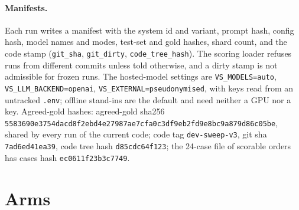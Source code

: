 \paragraph{Manifests.} Each run writes a manifest with the system id and variant, prompt hash, config hash, model names and modes, test-set and gold hashes, shard count, and the code stamp (\texttt{git\_sha}, \texttt{git\_dirty}, \texttt{code\_tree\_hash}). The scoring loader refuses runs from different commits unless told otherwise, and a dirty stamp is not admissible for frozen runs. The hosted-model settings are \texttt{VS\_MODELS=auto}, \texttt{VS\_LLM\_BACKEND=openai}, \texttt{VS\_EXTERNAL=pseudonymised}, with keys read from an untracked \texttt{.env}; offline stand-ins are the default and need neither a GPU nor a key. Agreed-gold hashes: agreed-gold sha256 \texttt{5583690e3754dacd8f2ebd4e27987ae7cfa0c3df9eb2fd9e8bc9a879d86c05be}, shared by every run of the current code; code tag \texttt{dev-sweep-v3}, git sha \texttt{7ad6ed41ea39}, code tree hash \texttt{d85cdc64f123}; the 24-case file of scorable orders has cases hash \texttt{ec0611f23b3c7749}.

\section{Arms}
\label{app:arms}

